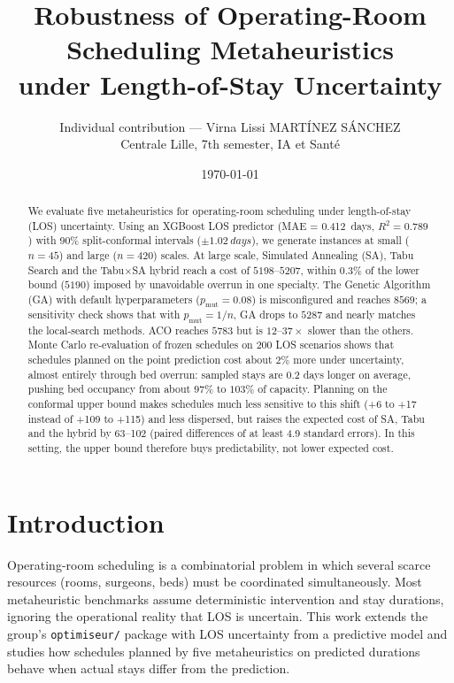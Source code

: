 \documentclass[11pt,a4paper]{article}
\title{Robustness of Operating-Room Scheduling Metaheuristics\\under Length-of-Stay Uncertainty}
\author{Individual contribution --- Virna Lissi MARTÍNEZ SÁNCHEZ\\Centrale Lille, 7th semester, IA et Santé}
\date{\today}
\begin{document}
\maketitle

\begin{abstract}
\noindent
We evaluate five metaheuristics for operating-room scheduling under length-of-stay (LOS) uncertainty. Using an XGBoost LOS predictor (MAE = \SI{0.412}{days}, \(R^2 = 0.789\)) with 90\% split-conformal intervals (\(\pm \SI{1.02}{days}\)), we generate instances at small (\(n=45\)) and large (\(n=420\)) scales. At large scale, Simulated Annealing (SA), Tabu Search and the Tabu\(\times\)SA hybrid reach a cost of \(5198\)--\(5207\), within \(0.3\%\) of the lower bound (\(5190\)) imposed by unavoidable overrun in one specialty. The Genetic Algorithm (GA) with default hyperparameters (\(p_{\mathrm{mut}}=0.08\)) is misconfigured and reaches \(8569\); a sensitivity check shows that with \(p_{\mathrm{mut}}=1/n\), GA drops to \(5287\) and nearly matches the local-search methods. ACO reaches \(5783\) but is \(12\)--\(37\times\) slower than the others. Monte Carlo re-evaluation of frozen schedules on \(200\) LOS scenarios shows that schedules planned on the point prediction cost about \(2\%\) more under uncertainty, almost entirely through bed overrun: sampled stays are 0.2 days longer on average, pushing bed occupancy from about \(97\%\) to \(103\%\) of capacity. Planning on the conformal upper bound makes schedules much less sensitive to this shift (+6 to +17 instead of +109 to +115) and less dispersed, but raises the expected cost of SA, Tabu and the hybrid by 63--102 (paired differences of at least 4.9 standard errors). In this setting, the upper bound therefore buys predictability, not lower expected cost. 
\end{abstract}

\section{Introduction}
Operating-room scheduling is a combinatorial problem in which several scarce resources (rooms, surgeons, beds) must be coordinated simultaneously. Most metaheuristic benchmarks assume deterministic intervention and stay durations, ignoring the operational reality that LOS is uncertain. This work extends the group's \texttt{optimiseur/} package with LOS uncertainty from a predictive model and studies how schedules planned by five metaheuristics on predicted durations behave when actual stays differ from the prediction.
\end{document}
